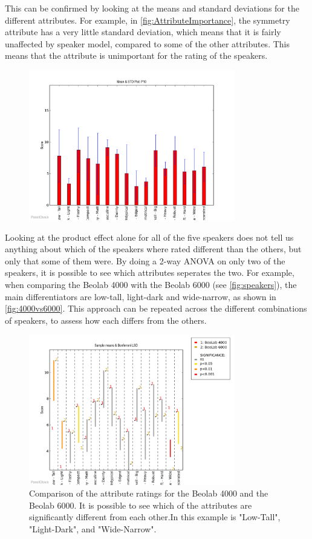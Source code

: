 This can be confirmed by looking at the means and standard deviations for the different attributes. For example, in \autoref{fig:AttributeImportance}, the symmetry attribute has a very little standard deviation, which means that it is fairly unaffected by speaker model, compared to some of the other attributes. This means that the attribute is unimportant for the rating of the speakers.

\begin{figure}[H]
\centering
\includegraphics[width = 0.8\textwidth]{Figure/AttributeImportance.png} 
\caption{}
\label{fig:AttributeImportance}
\end{figure}

Looking at the product effect alone for all of the five speakers does not tell us anything about which of the speakers where rated different than the others, but only that some of them were. By doing a 2-way ANOVA on only two of the speakers, it is possible to see which attributes seperates the two. For example, when comparing the Beolab 4000 with the Beolab 6000 (see \autoref{fig:speakers}), the main differentiators are low-tall, light-dark and wide-narrow, as shown in \autoref{fig:4000vs6000}. This approach can be repeated across the different combinations of speakers, to assess how each differs from the others.

\begin{figure}[H]
\centering
\includegraphics[width = 0.8\textwidth]{Figure/4000vs6000.png} 
\caption{Comparison of the attribute ratings for the Beolab 4000 and the Beolab 6000. It is possible to see which of the attributes are significantly different from each other.In this example is "Low-Tall", "Light-Dark", and "Wide-Narrow".}
\label{fig:4000vs6000}
\end{figure}



